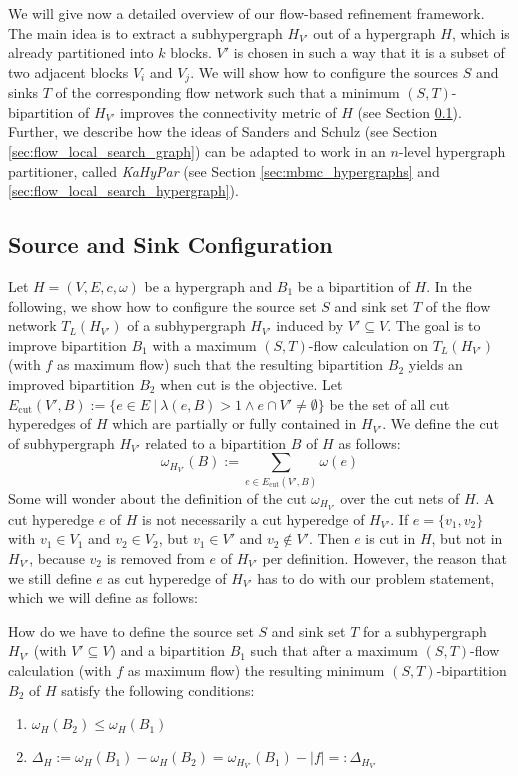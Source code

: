 We will give now a detailed overview of our flow-based refinement framework. The main
idea is to extract a subhypergraph $H_{V'}$ out of a hypergraph $H$, which is already
partitioned into $k$ blocks. $V'$ is chosen in such a way that it is a subset of two
adjacent blocks $V_i$ and $V_j$. We will show how to configure
the sources $S$ and sinks $T$ of the corresponding flow network such that
a minimum $(S,T)$-bipartition of $H_{V'}$ improves the connectivity metric of $H$
(see Section \ref{sec:source_and_sink}). Further, we describe how the ideas of
Sanders and Schulz \cite{sanders2011engineering} (see Section \ref{sec:flow_local_search_graph}) 
can be adapted to work in an $n$-level hypergraph partitioner, called \emph{KaHyPar}
(see Section \ref{sec:mbmc_hypergraphs} and \ref{sec:flow_local_search_hypergraph}). 

\subsection{Source and Sink Configuration}
\label{sec:source_and_sink}

Let $H = (V,E,c,\omega)$ be a hypergraph and $B_1$ be a bipartition of $H$.
In the following, we show how to configure the source set $S$ and sink set $T$ of the flow
network $T_L(H_{V'})$ of a subhypergraph $H_{V'}$ induced by $V' \subseteq V$. The goal is 
to improve bipartition $B_1$ with a maximum $(S,T)$-flow calculation 
on $T_L(H_{V'})$ (with $f$ as maximum flow) such that the resulting bipartition 
$B_2$ yields an improved bipartition $B_2$ when cut is the objective.
Let $E_{\text{cut}}(V',B) := \{ e \in E\ |\ \lambda(e,B) > 1 \land e \cap V' \neq \emptyset\}$ 
be the set of all cut hyperedges of $H$ which are partially or fully contained in $H_{V'}$.
We define the cut of subhypergraph $H_{V'}$ related to a bipartition $B$ of $H$
as follows:
\[\omega_{H_{V'}}(B) := \sum_{e \in E_{\text{cut}}(V',B)} \omega(e) \]
Some will wonder about the definition of the cut $\omega_{H_{V'}}$ over the
cut nets of $H$. A cut hyperedge $e$ of $H$ is not necessarily a cut hyperedge
of $H_{V'}$. If $e = \{v_1,v_2\}$ with $v_1 \in V_1$ and $v_2 \in V_2$, but
$v_1 \in V'$ and $v_2 \notin V'$. Then $e$ is cut in $H$, but not in $H_{V'}$, because
$v_2$ is removed from $e$ of $H_{V'}$ per definition. However, the reason that we still
define $e$ as cut hyperedge of $H_{V'}$ has to do with our problem statement, 
which we will define as follows:

\begin{problem}
\label{prob:ST}
How do we have to define the source set $S$ and sink set $T$ for a subhypergraph $H_{V'}$ 
(with $V' \subseteq V$) and a bipartition $B_1$ such that 
after a maximum $(S,T)$-flow calculation (with $f$ as maximum flow)
the resulting minimum $(S,T)$-bipartition $B_2$ of $H$ satisfy the following conditions:
\begin{enumerate}
\item $\omega_H(B_2) \le \omega_H(B_1)$
\item $\Delta_{H} := \omega_H(B_1) - \omega_H(B_2) = \omega_{H_{V'}}(B_1) - |f| =: \Delta_{H_{V'}}$
\end{enumerate}
\end{problem}

